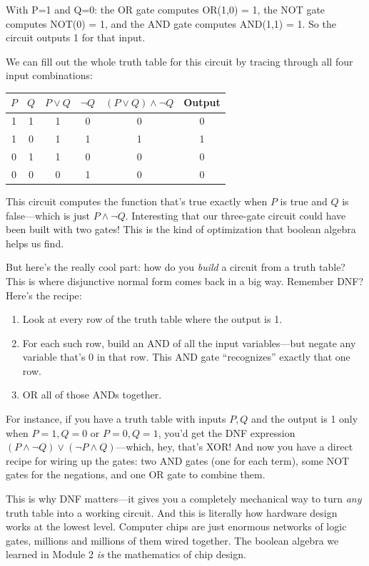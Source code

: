 \documentclass[11pt]{article}
\begin{document}
With P=1 and Q=0: the OR gate computes OR(1,0) = 1, the NOT gate computes NOT(0) = 1, and the AND gate computes AND(1,1) = 1. So the circuit outputs 1 for that input.

We can fill out the whole truth table for this circuit by tracing through all four input combinations:

\begin{center}
\begin{tabular}{cccccc}
\toprule
$P$ & $Q$ & $P \vee Q$ & $\lnot Q$ & $(P \vee Q) \wedge \lnot Q$ & Output \\
\midrule
1 & 1 & 1 & 0 & 0 & 0 \\
1 & 0 & 1 & 1 & 1 & 1 \\
0 & 1 & 1 & 0 & 0 & 0 \\
0 & 0 & 0 & 1 & 0 & 0 \\
\bottomrule
\end{tabular}
\end{center}

This circuit computes the function that's true exactly when $P$ is true and $Q$ is false---which is just $P \wedge \lnot Q$. Interesting that our three-gate circuit could have been built with two gates! This is the kind of optimization that boolean algebra helps us find.

But here's the really cool part: how do you \emph{build} a circuit from a truth table? This is where disjunctive normal form comes back in a big way. Remember DNF? Here's the recipe:

\begin{enumerate}
\item Look at every row of the truth table where the output is 1.
\item For each such row, build an AND of all the input variables---but negate any variable that's 0 in that row. This AND gate ``recognizes'' exactly that one row.
\item OR all of those ANDs together.
\end{enumerate}

For instance, if you have a truth table with inputs $P, Q$ and the output is 1 only when $P=1, Q=0$ or $P=0, Q=1$, you'd get the DNF expression $(P \wedge \lnot Q) \vee (\lnot P \wedge Q)$---which, hey, that's XOR! And now you have a direct recipe for wiring up the gates: two AND gates (one for each term), some NOT gates for the negations, and one OR gate to combine them.

This is why DNF matters---it gives you a completely mechanical way to turn \emph{any} truth table into a working circuit. And this is literally how hardware design works at the lowest level. Computer chips are just enormous networks of logic gates, millions and millions of them wired together. The boolean algebra we learned in Module 2 \emph{is} the mathematics of chip design.
\end{document}
